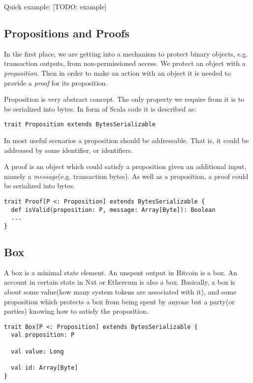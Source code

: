 \documentclass[]{report}   %
\begin{document}
Quick example: 
[TODO: example]

\subsection{Propositions and Proofs}

In the first place, we are getting into a mechanism to protect binary objects, e.g. transaction outputs, from non-permissioned access. We protect an object with a \textit{proposition}. Then in order to make an action with an object it is needed to provide a \textit{proof} for its proposition. 

Proposition is very abstract concept. The only property we require from it is to be serialized into bytes. In form of Scala code it is described as:

\begin{lstlisting}
trait Proposition extends BytesSerializable
\end{lstlisting}

In most useful scenarios a proposition should be addressable. That is, it could be addressed by some identifier, or identifiers.

A proof is an object which could satisfy a proposition given an additional input, namely a \textit{message}(e.g. transaction bytes). As well as a proposition, a proof could be serialized into bytes. 

\begin{lstlisting}
trait Proof[P <: Proposition] extends BytesSerializable {
  def isValid(proposition: P, message: Array[Byte]): Boolean
  ...
}
\end{lstlisting}


\subsection{Box}

A box is a minimal state element. An unspent output in Bitcoin is a box. An account in certain state in Nxt or Ethereum is also a box. Basically, a box is about some value(how many system tokens are associated with it), and some proposition which protects a box from being spent by anyone but a party(or parties) knowing how to satisfy the proposition.

\begin{lstlisting}
trait Box[P <: Proposition] extends BytesSerializable {
  val proposition: P

  val value: Long

  val id: Array[Byte]
}
\end{lstlisting}
\end{document}
